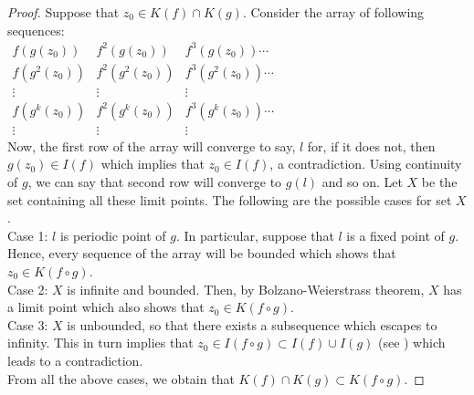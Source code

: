 \documentclass[a4paper,12pt]{amsart}
\newcommand{\ity}{\infty}
\numberwithin{equation}{section}
\begin{document}
\begin{proof}
Suppose that $z_0\in K(f)\cap K(g)$. Consider the array of  following sequences:\\
$\begin{array}{ccccc}
f(g(z_0)) &f^2(g(z_0))&f^3(g(z_0))\cdots\\
f(g^2(z_0))&f^2(g^2(z_0))&f^3(g^2(z_0))\cdots\\
\vdots&\vdots&\vdots\\
f(g^k(z_0))&f^2(g^k(z_0))&f^3(g^k(z_0))\cdots\\
\vdots&\vdots&\vdots

\end{array}$\\
Now, the first row of the array will converge to say, $l$ for, if it does not, then $g(z_0)\in I(f)$ which implies that $z_0\in I(f)$, a contradiction. Using continuity of $g$, we can say that second row will converge to $g(l)$ and so on. Let $X$ be the set containing all these limit points. The following are the possible cases for set $X$.\\
Case 1: $l$ is periodic point of $g$. In particular, suppose that $l$ is a fixed point of $g$. Hence, every sequence of the array will be bounded which shows that $z_0\in K(f\circ g)$.\\
Case 2: $X$ is infinite and bounded. Then, by Bolzano-Weierstrass theorem, $X$ has a limit point which also shows that $z_0\in K(f\circ g)$.\\
Case 3: $X$ is unbounded, so that there exists a subsequence which  escapes to infinity. This in turn implies that $z_0\in I(f\circ g)\subset I(f) \cup I(g)$ (see \cite{d1}) which leads to  a contradiction.\\
From all the above cases, we obtain that  $K(f)\cap K(g)\subset K(f\circ g).$
\end{proof}
 
\end{document}
